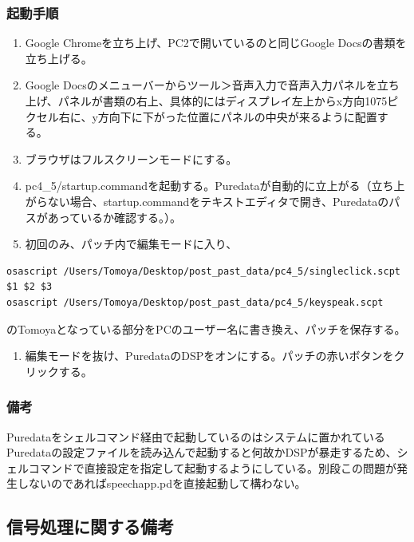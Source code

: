 \documentclass[a4paper]{jsarticle}
\begin{document}
\subsubsection{起動手順}\label{ux8d77ux52d5ux624bux9806-2}

\begin{enumerate}
\def\labelenumi{\arabic{enumi}.}
\tightlist
\item
  Google Chromeを立ち上げ、PC2で開いているのと同じGoogle
  Docsの書類を立ち上げる。
\item
  Google
  Docsのメニューバーからツール＞音声入力で音声入力パネルを立ち上げ、パネルが書類の右上、具体的にはディスプレイ左上からx方向1075ピクセル右に、y方向下に下がった位置にパネルの中央が来るように配置する。
\item
  ブラウザはフルスクリーンモードにする。
\item
  pc4\_5/startup.commandを起動する。Puredataが自動的に立上がる（立ち上がらない場合、startup.commandをテキストエディタで開き、Puredataのパスがあっているか確認する。）。
\item
  初回のみ、パッチ内で編集モードに入り、
\end{enumerate}

\begin{verbatim}
osascript /Users/Tomoya/Desktop/post_past_data/pc4_5/singleclick.scpt $1 $2 $3
osascript /Users/Tomoya/Desktop/post_past_data/pc4_5/keyspeak.scpt
\end{verbatim}

のTomoyaとなっている部分をPCのユーザー名に書き換え、パッチを保存する。

\begin{enumerate}
\def\labelenumi{\arabic{enumi}.}
\setcounter{enumi}{5}
\tightlist
\item
  編集モードを抜け、PuredataのDSPをオンにする。パッチの赤いボタンをクリックする。
\end{enumerate}

\subsubsection{備考}\label{ux5099ux8003-2}

Puredataをシェルコマンド経由で起動しているのはシステムに置かれているPuredataの設定ファイルを読み込んで起動すると何故かDSPが暴走するため、シェルコマンドで直接設定を指定して起動するようにしている。別段この問題が発生しないのであればspeechapp.pdを直接起動して構わない。

\subsection{信号処理に関する備考}\label{ux4fe1ux53f7ux51e6ux7406ux306bux95a2ux3059ux308bux5099ux8003}
\end{document}
